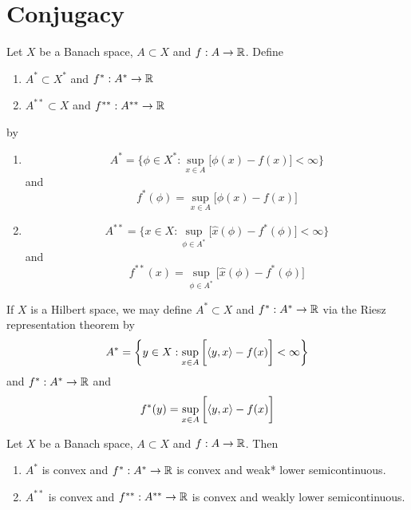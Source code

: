 \documentclass{book}
\begin{document}
	\newpage 
	\section{Conjugacy}
	
	\begin{defn} \ld{}
	Let $X$ be a Banach space, $A \subset X$ and $f:A \rightarrow \mathbb{R}$. Define 
	\begin{enumerate}
		\item $A^* \subset X^*$ and $f^*: A^* \rightarrow \mathbb{R}$ 
		\item $A^{**} \subset X$ and $f^{**}:A^{**} \rightarrow \mathbb{R}$
	\end{enumerate}
	by 
	\begin{enumerate}
		\item $$A^* = \bigg \{\phi \in X^*: \sup_{x \in A} \bigg[ \phi(x) - f(x) \bigg] < \infty \bigg  \}$$ and $$f^*(\phi) = \sup_{x \in A} \bigg[ \phi(x) - f(x) \bigg] $$  
		\item $$A^{**} = \bigg \{x \in X: \sup_{\phi \in A^*} \bigg[ \hat{x}(\phi) - f^*(\phi) \bigg] < \infty \bigg \}$$ and $$f^{**}(x) = \sup_{\phi \in A^*} \bigg[ \hat{x}(\phi) - f^*(\phi) \bigg]$$
	\end{enumerate}
	\end{defn} 

	\begin{note}
		If $X$ is a Hilbert space, we may define $A^* \subset X$ and $f^*: A^* \rightarrow \mathbb{R}$ via the Riesz representation theorem by $$A^* = \bigg \{y \in X: \sup_{x \in A} \bigg[ \langle y, x \rangle - f(x) \bigg] < \infty \bigg  \}$$ and $f^*: A^* \rightarrow \mathbb{R}$ and $$ f^*(y) = \sup_{x \in A} \bigg[ \langle y, x \rangle - f(x) \bigg] $$
	\end{note}
	
	\begin{ex} \lex{}
	Let $X$ be a Banach space, $A \subset X$ and $f:A \rightarrow \mathbb{R}$. Then 
	\begin{enumerate}
		\item $A^*$ is convex and $f^*:A^* \rightarrow \mathbb{R}$ is convex and weak* lower semicontinuous.
		\item $A^{**}$ is convex and $f^{**}:A^{**} \rightarrow \mathbb{R}$ is convex and weakly lower semicontinuous.
	\end{enumerate} 
	\end{ex}
	
\end{document}
